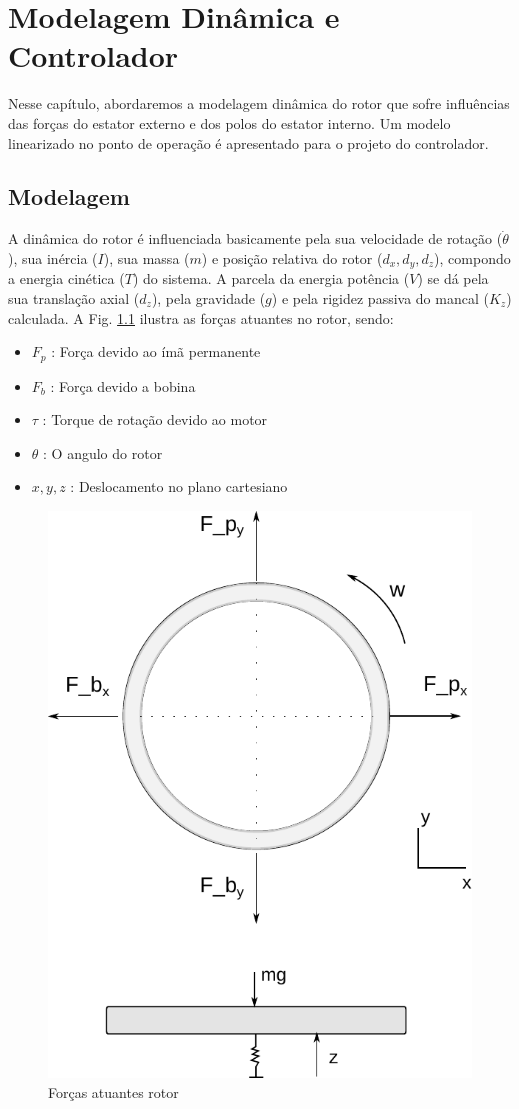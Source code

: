 \pagestyle{empty}
\cleardoublepage
\pagestyle{fancy}

\chapter{Modelagem Dinâmica e Controlador} \label{Cap:Modelagem:Dinamica}

 Nesse capítulo, abordaremos a modelagem dinâmica do rotor que sofre influências das forças do estator externo e dos polos do estator interno. Um modelo linearizado no ponto de operação é apresentado para o projeto do controlador.
 
\section{Modelagem}

A dinâmica do rotor é influenciada basicamente pela sua velocidade de rotação ($\dot{\theta}$), sua inércia ($I$), sua massa ($m$) e posição relativa do rotor ($d_x,d_y,d_z$), compondo a energia cinética ($T$) do sistema. A parcela da energia potência ($V$) se dá pela sua translação axial ($d_z$), pela gravidade ($g$) e pela rigidez passiva do mancal ($K_z$) calculada. A Fig. \ref{fig:modelo:forcas} ilustra as forças atuantes no rotor, sendo:

 \begin{itemize}
 	\item $F_p$ : Força devido ao ímã permanente
 	\item $F_b$ : Força devido a bobina
 	\item $\tau$ : Torque de rotação devido ao motor
 	\item $\theta$ : O angulo do rotor
 	\item $x,y,z$ : Deslocamento no plano cartesiano 
 \end{itemize}

 \begin{figure}[th]
 	\centering
 	\includegraphics[width=0.7\linewidth]{../Figs/Modelagem/forcas}
 	\caption{Forças atuantes rotor}
 	\label{fig:modelo:forcas}
 \end{figure}
 
